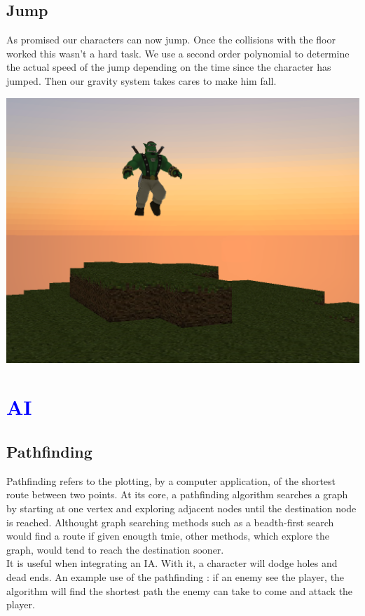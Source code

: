 \documentclass[article]{report}             %
\begin{document}
			\section{Jump}
				As promised our characters can now jump. Once the collisions with the floor worked this wasn't a hard task. We use a second order polynomial to determine the actual speed of the jump depending on the time since the character has jumped. Then our gravity system takes cares to make him fall.
				\begin{center}
				\includegraphics[width = 14cm]{images/SinbadJump.png}	
			\end{center}

		\chapter{\textcolor{blue}{AI}}
			\section{Pathfinding}
				Pathfinding refers to the plotting, by a computer application, of the shortest route between two points. At its core, a pathfinding algorithm searches a graph by starting at one vertex and exploring adjacent nodes until the destination node is reached. Althought graph searching methods such as a beadth-first search would find a route if given enougth tmie, other methods, which explore the graph, would tend to reach the destination sooner. \\
 It is useful when integrating an IA. With it, a character will dodge holes and dead ends. An example use of the pathfinding : if an enemy see the player, the algorithm will find the shortest path the enemy can take to come and attack the player.
\end{document}
